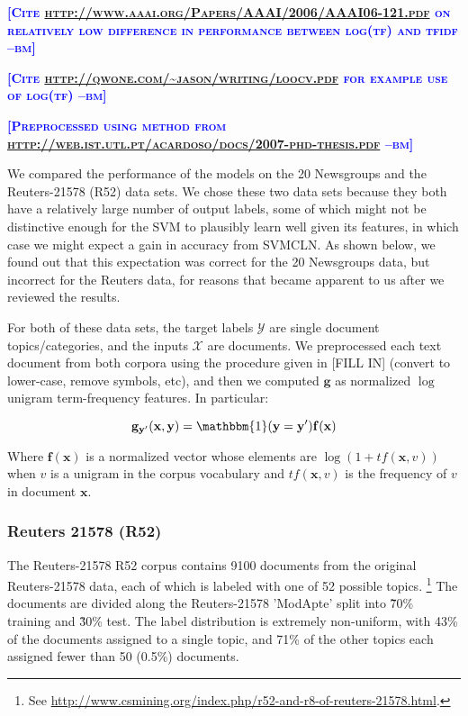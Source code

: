 \documentclass{article} %
\newcommand{\bmcomment}[1]{\textcolor{blue}{\textsc{\textbf{[#1 --bm]}}}}
\begin{document}
\bmcomment{Cite \url{http://www.aaai.org/Papers/AAAI/2006/AAAI06-121.pdf}
on relatively low difference in performance between log(tf) and tfidf}

\bmcomment{Cite \url{http://qwone.com/~jason/writing/loocv.pdf} for 
example use of log(tf)}

\bmcomment{Preprocessed using method from 
\url{http://web.ist.utl.pt/acardoso/docs/2007-phd-thesis.pdf}}

We compared the performance of the models on the 20 Newsgroups and
the Reuters-21578 (R52) data sets.  We chose these two data sets
because they both have a relatively large number of output labels,
some of which might not be distinctive enough for the SVM to plausibly
learn well given its features, in which case we might expect a gain in 
accuracy from SVMCLN.  As shown below, we found out that this 
expectation was correct for the 20 Newsgroups data, but incorrect for 
the Reuters data, for reasons that became apparent to us after we
reviewed the results.

For both of these data sets, the target labels $\mathcal{Y}$ are 
single document topics/categories, and the inputs $\mathcal{X}$ are
documents.  We preprocessed each text document from both corpora 
using the procedure given in [FILL IN] (convert to lower-case, 
remove symbols, etc), and then we computed $\mathbf{g}$ as normalized
$\log$ unigram term-frequency features.  In particular:

\begin{equation}
\mathbf{g}_{\mathbf{y'}}(\mathbf{x},\mathbf{y}) = \mathbbm{1}(\mathbf{y}=\mathbf{y'})\mathbf{f}(\mathbf{x})
\end{equation}

Where $\mathbf{f}(\mathbf{x})$ is a normalized vector whose elements 
are $\log(1+tf(\mathbf{x},v))$ when $v$ is a unigram in the corpus 
vocabulary and $tf(\mathbf{x},v)$ is the frequency of $v$ in document
 $\mathbf{x}$.

\subsubsection{Reuters 21578 (R52)}

The Reuters-21578 R52 corpus contains 9100 documents from the original
Reuters-21578 data, each of which is labeled with one of 52 possible topics.
\footnote{See 
\url{http://www.csmining.org/index.php/r52-and-r8-of-reuters-21578.html}.}  
The documents are divided along the Reuters-21578 'ModApte' split
into \~70\% training and \~30\% test.  The label distribution is extremely
non-uniform, with 43\% of the documents assigned to a single topic, and
71\% of the other topics each assigned fewer than 50 (0.5\%) documents.
\end{document}
